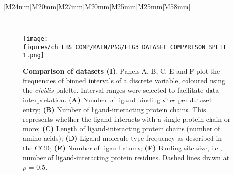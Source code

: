 \begin{landscape}
\begin{longtable}{|M{24mm}|M{20mm}|M{27mm}|M{20mm}|M{25mm}|M{25mm}|M{58mm}|}
\caption[Protein-ligand datasets summary statistics]{\textbf{Protein-ligand datasets summary statistics.} LIGYSIS is our reference dataset, LIGYSIS\textsubscript{NI} is a subset with no ion (NI) binding sites, sc-PDB\textsubscript{FULL}, bMOAD\textsubscript{SUB} and CHEN11 constitute training datasets, whereas PDBbind\textsubscript{REF}, SC6K, HOLO4K and COACH420 are test sets. \# Structures, \# Sites and \# Ligands represent the number of PDB structures, ligand sites and total number of ligands for each dataset. For LIGYSIS and LIGYSIS\textsubscript{NI}, 3,448 and 2,775, are the number of structural segments, each represented by a single chain. For each segment, biologically relevant ligands across structures were considered: $N$ = 23,321 (LIGYSIS) and $N$ = 19,012 (LIGYSIS\textsubscript{NI}). The number of ligands is not equal to the number of sites for LIGYSIS, as ligands from multiple structures of the same protein are aggregated into unique sites. Overlap (\%) is the percentage of protein-ligand complexes overlapping between these sets and LIGYSIS. Methods are the ligand site predictors that use these datasets for training or test. Only original versions of each dataset are considered in the analysis e.g., HOLO4K, but not HOLO4K\textsubscript{Mlig}, nor HOLO4K\textsubscript{Mlig+} HAP, or HAP-small. The same goes for Mlig and Mlig+ versions of COACH420, sc-PDB\textsubscript{SUB} and sc-PDB\textsubscript{RICH}. \textit{ALL*} represents all methods in this work except for fpocket, PocketFinder\textsuperscript{+}, Ligsite\textsuperscript{+} and Surfnet\textsuperscript{+}.}
\label{tab:datasets_comp}\\
\end{longtable}
\end{landscape}

\FloatBarrier

\begin{figure}[ht!]
    \centering
    \texttt{[image: figures/ch\_LBS\_COMP/MAIN/PNG/FIG3\_DATASET\_COMPARISON\_SPLIT\_1.png]}
    \caption[Comparison of datasets (I)]{\textbf{Comparison of datasets (I).} Panels A, B, C, E and F plot the frequencies of binned intervals of a discrete variable, coloured using the \textit{cividis} palette. Interval ranges were selected to facilitate data interpretation. \textbf{(A)} Number of ligand binding sites per dataset entry; \textbf{(B)} Number of ligand-interacting protein chains. This represents whether the ligand interacts with a single protein chain or more; \textbf{(C)} Length of ligand-interacting protein chains (number of amino acids); \textbf{(D)} Ligand molecule type frequency as described in the CCD; \textbf{(E)} Number of ligand atoms; \textbf{(F)} Binding site size, i.e., number of ligand-interacting protein residues. Dashed lines drawn at $p$ = 0.5.}
    \label{fig:dataset_comp_1}
\end{figure}

